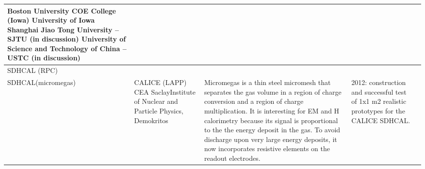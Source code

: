 \begin{landscape}
\begin{adjustbox}{max width=1\textheight,totalheight=1\textwidth}
\begin{tabularx}{2\textheight}{lXXXX}
    Boston University                  \newline
    COE College (Iowa)                         \newline
    University of Iowa                                 \newline
    Shanghai Jiao Tong University -- SJTU (in discussion)      \newline
    University of Science and Technology of China -- USTC (in discussion) &
     &
     &                                                                                                                                                                                                                                   \\
     \midrule
    SDHCAL (RPC)                                                                                                   &                                                                                                                                         &                                                                                                                                                                                                                                                                                                                                                                                      &                                                                                                                                                                                                                                                                 &                                                                                                                                                                                                                                     \\
    \midrule
    SDHCAL(micromegas) &
     CALICE (LAPP) \newline CEA Saclay\newline Institute of Nuclear and Particle Physics, Demokritos                                                            &
      Micromegas is a thin steel micromesh that separates the gas volume in a region of charge conversion and a region of charge multiplication. It is interesting for EM and H calorimetry because its signal is proportional to the the energy deposit in the gas. To avoid discharge upon very large energy deposits, it now incorporates resistive elements on the readout electrodes. &
       2012: construction and successful test of 1x1 m2 realistic prototypes for the CALICE SDHCAL.\newline

\end{tabularx}
\end{adjustbox}
\end{landscape}
